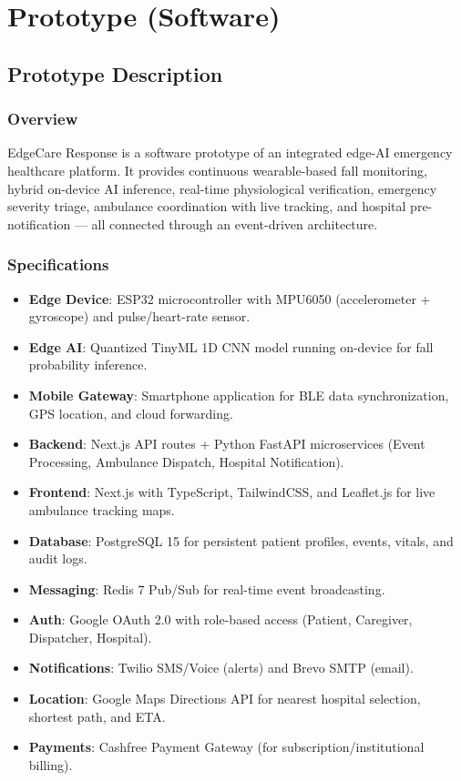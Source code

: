 \chapter{Prototype (Software)}

\section[Prototype Description]{\textbf{Prototype Description}}

\subsection{Overview}

EdgeCare Response is a software prototype of an integrated edge-AI emergency healthcare platform. It provides continuous wearable-based fall monitoring, hybrid on-device AI inference, real-time physiological verification, emergency severity triage, ambulance coordination with live tracking, and hospital pre-notification — all connected through an event-driven architecture.

\subsection{Specifications}

\begin{itemize}
\item \textbf{Edge Device}: ESP32 microcontroller with MPU6050 (accelerometer + gyroscope) and pulse/heart-rate sensor.
\item \textbf{Edge AI}: Quantized TinyML 1D CNN model running on-device for fall probability inference.
\item \textbf{Mobile Gateway}: Smartphone application for BLE data synchronization, GPS location, and cloud forwarding.
\item \textbf{Backend}: Next.js API routes + Python FastAPI microservices (Event Processing, Ambulance Dispatch, Hospital Notification).
\item \textbf{Frontend}: Next.js with TypeScript, TailwindCSS, and Leaflet.js for live ambulance tracking maps.
\item \textbf{Database}: PostgreSQL 15 for persistent patient profiles, events, vitals, and audit logs.
\item \textbf{Messaging}: Redis 7 Pub/Sub for real-time event broadcasting.
\item \textbf{Auth}: Google OAuth 2.0 with role-based access (Patient, Caregiver, Dispatcher, Hospital).
\item \textbf{Notifications}: Twilio SMS/Voice (alerts) and Brevo SMTP (email).
\item \textbf{Location}: Google Maps Directions API for nearest hospital selection, shortest path, and ETA.
\item \textbf{Payments}: Cashfree Payment Gateway (for subscription/institutional billing).
\end{itemize}

